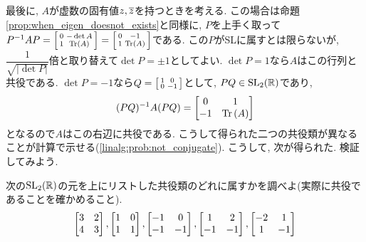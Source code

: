 最後に, $A$が虚数の固有値$z,\overline{z}$を持つときを考える. この場合は命題\ref{prop:when_eigen_doesnot_exists}と同様に, $P$を上手く取って$P^{-1}AP=\left[\begin{smallmatrix}0 & -\det{A} \\ 1 & \mathrm{Tr}\left( A \right)\end{smallmatrix}\right] = \left[\begin{smallmatrix}0 & -1 \\ 1 & \mathrm{Tr}\left( A \right)\end{smallmatrix}\right]$である. この$P$がSLに属すとは限らないが, $\dfrac{1}{\sqrt{|\det{P}|}}$倍と取り替えて$\det{P}=\pm 1$としてよい. $\det{P}=1$なら$A$はこの行列と共役である. $\det{P}=-1$なら$Q = \left[\begin{smallmatrix}1 & 0 \\ 0 & -1\end{smallmatrix}\right]$として, $PQ\in \mathrm{SL}_{2}(\mathbb{R})$であり,
\[(PQ)^{-1} A (PQ) = \begin{bmatrix}0 & 1 \\ -1 & \mathrm{Tr}\left( A \right)\end{bmatrix}\]
となるので$A$はこの右辺に共役である. こうして得られた二つの共役類が異なることが計算で示せる(\ref{linalg:prob:not_conjugate}). こうして, 次が得られた.
検証してみよう.
\begin{egprob}
次の$\mathrm{SL}_{2}(\mathbb{R})$の元を上にリストした共役類のどれに属すかを調べよ(実際に共役であることを確かめること).
\[ \begin{bmatrix}3&2\\ 4&3\end{bmatrix}, \begin{bmatrix}1 & 0 \\ 1&1 \end{bmatrix}, \begin{bmatrix}-1 & 0 \\ -1 & -1\end{bmatrix}, \begin{bmatrix}1 & 2 \\ -1 & -1\end{bmatrix}, \begin{bmatrix}-2 & 1\\ 1 & -1\end{bmatrix} \]

\end{egprob}




